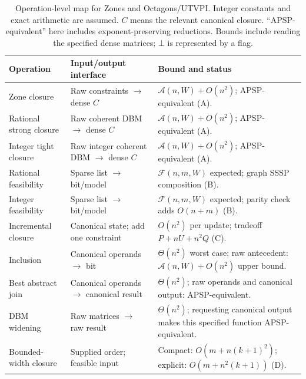 \documentclass[manuscript,11pt,screen,nonacm]{acmart}
\theoremstyle{definition}
\newcommand{\Ftime}{\mathcal F(n,m,W)}
\newcommand{\Atime}{\mathcal A(n,W)}
\begin{document}
\begin{table}[H]
\caption{Operation-level map for Zones and Octagons/UTVPI. Integer constants and exact arithmetic are assumed. $C$ means the relevant canonical closure. ``APSP-equivalent'' here includes exponent-preserving reductions. Bounds include reading the specified dense matrices; $\bot$ is represented by a flag.}
\label{tab:map}
\begin{tabularx}{\textwidth}{@{}P{.21\textwidth}P{.24\textwidth}Y@{}}
\toprule
Operation & Input/output interface & Bound and status \\
\midrule
Zone closure & Raw constraints $\to$ dense $C$ & $\Atime+O(n^2)$; APSP-equivalent (A).\\
Rational strong closure & Raw coherent DBM $\to$ dense $C$ & $\Atime+O(n^2)$; APSP-equivalent (A).\\
Integer tight closure & Raw integer coherent DBM $\to$ dense $C$ & $\Atime+O(n^2)$; APSP-equivalent (A).\\
Rational feasibility & Sparse list $\to$ bit/model & $\Ftime$ expected; graph SSSP composition (B).\\
Integer feasibility & Sparse list $\to$ bit/model & $\Ftime$ expected; parity check adds $O(n+m)$ (B).\\
Incremental closure & Canonical state; add one constraint & $O(n^2)$ per update; tradeoff $P+nU+n^2Q$ (C).\\
Inclusion & Canonical operands $\to$ bit & $\Theta(n^2)$ worst case; raw antecedent: $\Atime+O(n^2)$ upper bound.\\
Best abstract join & Canonical operands $\to$ canonical result & $\Theta(n^2)$; raw operands and canonical output: APSP-equivalent.\\
DBM widening & Raw matrices $\to$ raw result & $\Theta(n^2)$; requesting canonical output makes this specified function APSP-equivalent.\\
Bounded-width closure & Supplied order; feasible input & Compact: $O(m+n(k+1)^2)$; explicit: $O(m+n^2(k+1))$ (D).\\
\bottomrule
\end{tabularx}
\end{table}
\end{document}
